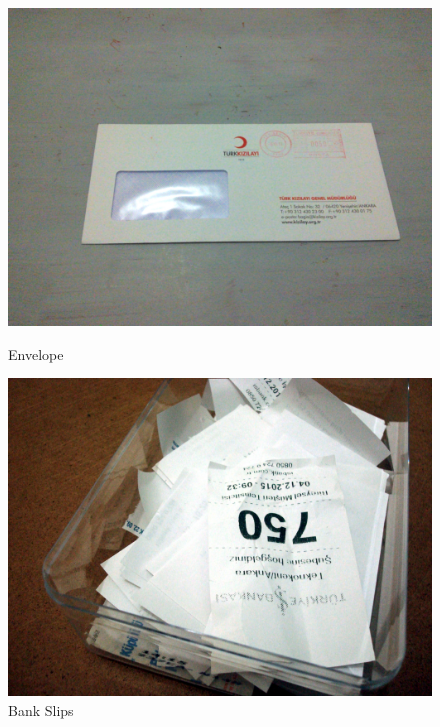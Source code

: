 \begin{figure}[!tbp]
  \centering
  \begin{minipage}[b]{0.48\textwidth}
    \includegraphics[width=\textwidth]{project_graphics/collected_envelope.jpg}
    \caption{Envelope}
    \label{fig:Envelope}
  \end{minipage}
  \hfill
  \begin{minipage}[b]{0.48\textwidth}
    \includegraphics[width=\textwidth]{project_graphics/collected_bankslips.jpg}
    \caption{Bank Slips}
    \label{fig:BankSlips}
  \end{minipage}
\end{figure}



